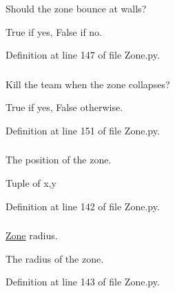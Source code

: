 Should the zone bounce at walls? 

True if yes, False if no. 

Definition at line 147 of file Zone.py.

\hypertarget{class_zone_1_1_zone_a45db96faa826bf1e485c70da9c07d83e}{
\subsubsection[{killteam}]{}}
\label{class_zone_1_1_zone_a45db96faa826bf1e485c70da9c07d83e}


Kill the team when the zone collapses? 

True if yes, False otherwise. 

Definition at line 151 of file Zone.py.

\hypertarget{class_zone_1_1_zone_ae30b162378f40661dfcb854ec7926bdb}{
\subsubsection[{position}]{}}
\label{class_zone_1_1_zone_ae30b162378f40661dfcb854ec7926bdb}


The position of the zone. 

Tuple of x,y 

Definition at line 142 of file Zone.py.

\hypertarget{class_zone_1_1_zone_a6ee5fd031ade8ecb6b2f41455ad309c4}{
\subsubsection[{radius}]{}}
\label{class_zone_1_1_zone_a6ee5fd031ade8ecb6b2f41455ad309c4}


\hyperlink{class_zone_1_1_zone}{Zone} radius. 

The radius of the zone. 

Definition at line 143 of file Zone.py.

\hypertarget{class_zone_1_1_zone_a57b65c53ff747cf9504c88ff37d7b9ee}{
\subsubsection[{settings}]{}}
\label{class_zone_1_1_zone_a57b65c53ff747cf9504c88ff37d7b9ee}


